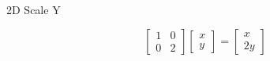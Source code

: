 \documentclass{beamer}
\begin{document}
\begin{frame}{2D Scale Y}

\[ \left[ \begin{array}{cc} 1 & 0 \\ 0 & 2 \end{array} \right] \left[ \begin{array}{c} x \\ y \end{array} \right] =  \left[ \begin{array}{c} x \\ 2y  \end{array} \right] \]

\begin{figure}[t]
    \captionsetup[subfloat]{labelformat=empty}
	\centering
\end{figure}

\end{frame}
\end{document}
